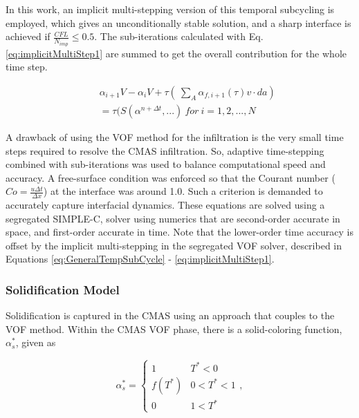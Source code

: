 \documentclass[%
 aip,
 amsmath,amssymb,
 reprint,%
floatfix]{revtex4-1}
\begin{document}
\noindent In this work, an implicit multi-stepping version of this temporal subcycling is employed, which gives an unconditionally stable solution, and a sharp interface is achieved if $\frac{CFL}{N_{imp}} \leqslant 0.5 $. The sub-iterations calculated with Eq. \ref{eq:implicitMultiStep1} are summed to get the overall contribution for the whole time step.

\begin{eqnarray}
\label{eq:implicitMultiStep1}
    &&\alpha_{i+1}V - \alpha_{i}V + \tau( \ \sum_{A}\alpha_{f,i+1}(\tau) v \cdot da) \nonumber \\
    &&=\tau(S(\alpha^{n+\Delta t},...) ~ for~ i = 1, 2, ..., N
\end{eqnarray}

A drawback of using the VOF method for the infiltration is the very small time steps required to resolve the CMAS infiltration. So, adaptive time-stepping combined with sub-iterations was used to balance computational speed and accuracy. A free-surface condition was enforced so that the Courant number ($Co = \frac{u \Delta t}{\Delta x}$) at the interface was around 1.0. Such a criterion is demanded to accurately capture interfacial dynamics. 
These equations are solved using a segregated SIMPLE-C, solver using numerics that are second-order accurate in space, and first-order accurate in time. Note that the lower-order time accuracy is offset by the implicit multi-stepping in the segregated VOF solver, described in Equations \ref{eq:GeneralTempSubCycle} - \ref{eq:implicitMultiStep1}. 

\subsubsection{Solidification Model}
\label{sec:solidmodel}
Solidification is captured in the CMAS using an approach that couples to the VOF method. Within the CMAS VOF phase, there is a solid-coloring function, $\alpha_s^*$, given as   

\begin{equation}
    \alpha^{*}_{s} = \begin{cases}
    1 & T^{*} < 0 \\
    f(T^{*})& 0<T^{*}<1 \\
    0& 1 < T^{*}
    \end{cases},
    \label{eq:solidificationModel}
\end{equation}
\end{document}
